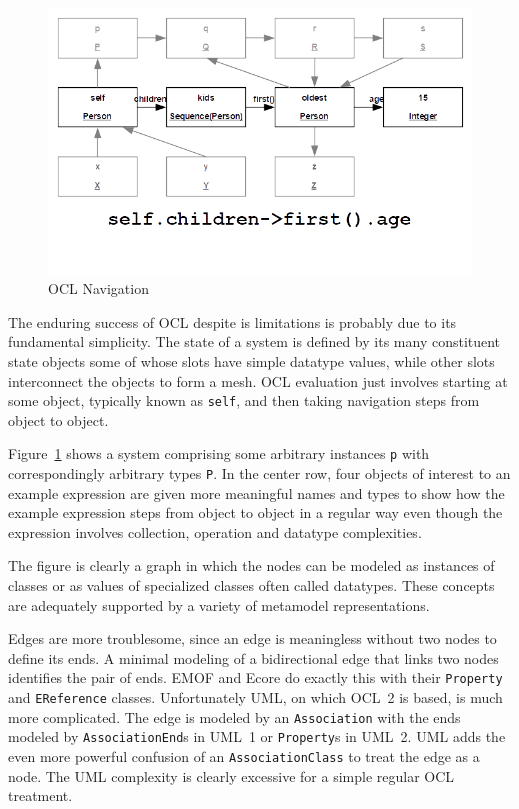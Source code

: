 \documentclass{jot}
\begin{document}
\begin{figure}
	\begin{center}
		\includegraphics[width=4.5in]{OCLNavigation.png}
	\end{center}
	\vspace{-40pt}
	\caption{OCL Navigation}
	\label{fig:OCLNavigation}
\end{figure}

The enduring success of OCL despite is limitations is probably due to its fundamental simplicity. The state of a system is defined by its many constituent state objects some of whose slots have simple datatype values, while other slots interconnect the objects to form a mesh. OCL evaluation just involves starting at some object, typically known as \verb$self$, and then taking navigation steps from object to object.

Figure~\ref{fig:OCLNavigation} shows a system comprising some arbitrary instances \verb$p$ with correspondingly arbitrary types \verb$P$. In the center row, four objects of interest to an example expression are given more meaningful names and types to show how the example expression steps from object to object in a regular way even though the expression involves collection, operation and datatype complexities.

The figure is clearly a graph in which the nodes can be modeled as instances of classes or as values of specialized classes often called datatypes. These concepts are adequately supported by a variety of metamodel representations.

Edges are more troublesome, since an edge is meaningless without two nodes to define its ends. A minimal modeling of a bidirectional edge that links two nodes identifies the pair of ends. EMOF and Ecore do exactly this with their \verb$Property$ and \verb$EReference$ classes. Unfortunately UML, on which OCL~2 is based, is much more complicated. The edge is modeled by an \verb$Association$ with the ends modeled by \verb$AssociationEnd$s in UML~1 or \verb$Property$s in UML~2. UML adds the even more powerful confusion of an \verb$AssociationClass$ to treat the edge as a node. The UML complexity is clearly excessive for a simple regular OCL treatment.
\end{document}
